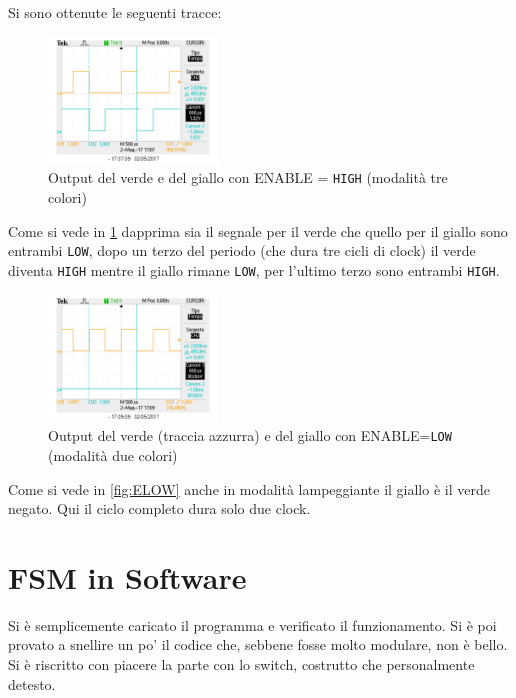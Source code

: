 \documentclass[a4paper,10pt]{article}
\def\code#1{\texttt{#1}}
\begin{document}
Si sono ottenute le seguenti tracce:


\begin{figure}[H]
	\centering
	\includegraphics[width=0.4\textwidth]{../grafici/verde_giallo.png}
	\caption{Output del verde e del giallo con ENABLE = \code{HIGH} (modalità tre colori)}
	\label{fig:VGE}
\end{figure}

Come si vede in \cref{fig:VGE} dapprima sia il segnale per il verde che quello per il giallo sono entrambi \code{LOW}, dopo un terzo del periodo (che dura tre cicli di clock) il verde diventa \code{HIGH} mentre il giallo rimane \code{LOW}, per l'ultimo terzo sono entrambi \code{HIGH}.



\begin{figure}[H]
	\centering
	\includegraphics[width=0.4\textwidth]{../grafici/verde_gialloELOW.png}
	\caption{Output del verde (traccia azzurra) e del giallo con ENABLE=\code{LOW} (modalità due colori)}
	\label{fig:VGELOW}
\end{figure}

Come si vede in \cref{fig:ELOW} anche in modalità lampeggiante il giallo è il verde negato. Qui il ciclo completo dura solo due clock.


\section{FSM in Software}

Si è semplicemente caricato il programma e verificato il funzionamento. Si è poi provato a snellire un po' il codice che, sebbene fosse molto modulare, non è bello. Si è riscritto con piacere la parte con lo switch, costrutto che personalmente detesto.
\end{document}
